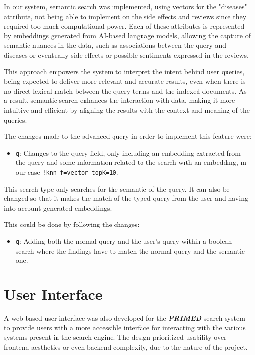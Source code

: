 \documentclass[sigconf]{acmart}
\begin{document}
In our system, semantic search was implemented, using vectors for the "diseases" attribute, not being able to implement on the side effects and reviews since they required too much computational power. Each of these attributes is represented by embeddings generated from AI-based language models, allowing the capture of semantic nuances in the data, such as associations between the query and diseases or eventually side effects or possible sentiments expressed in the reviews.

This approach empowers the system to interpret the intent behind user queries, being expected to deliver more relevant and accurate results, even when there is no direct lexical match between the query terms and the indexed documents. As a result, semantic search enhances the interaction with data, making it more intuitive and efficient by aligning the results with the context and meaning of the queries.

The changes made to the advanced query in order to implement this feature were:

\begin{itemize}
	\item \texttt{q}: Changes to the query field, only including an embedding extracted from the query and some information related to the search with an embedding, in our case {\texttt{!knn f=vector topK=10}}.
\end{itemize}

This search type only searches for the semantic of the query. It can also be changed so that it makes the match of the typed query from the user and having into account generated embeddings.

This could be done by following the changes:

\begin{itemize}
	\item \texttt{q}: Adding both the normal query and the user's query within a boolean search where the findings have to match the normal query and the semantic one.
\end{itemize}

\section{User Interface}

A web-based user interface was also developed for the \textit{\textbf{PRIMED}} search system to provide users with a more accessible interface for interacting with the various systems present in the search engine. The design prioritized usability over frontend aesthetics or even backend complexity, due to the nature of the project.
\end{document}
